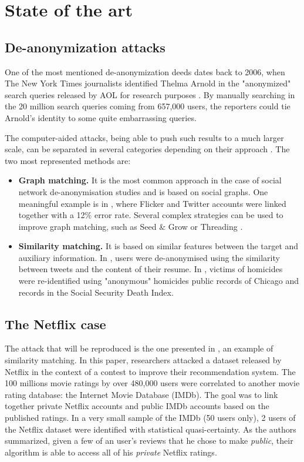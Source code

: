 \section{State of the art}\label{sec:state}

\subsection{De-anonymization attacks}

One of the most mentioned de-anonymization deeds dates back to 2006, when The New York Times journalists identified Thelma Arnold in the "anonymized" search queries released by AOL for research purposes \cite{nytimes}. By manually searching in the 20 million search queries coming from 657,000 users, the reporters could tie Arnold's identity to some quite embarrassing queries.

The computer-aided attacks, being able to push such results to a much larger scale, can be separated in several categories depending on their approach \cite{survey}. The two most represented methods are:

\begin{itemize}
	\item \textbf{Graph matching.} It is the most common approach in the case of social network de-anonymisation studies and is based on social graphs. One meaningful example is in \cite{graph_twitter}, where Flicker and Twitter accounts were linked together with a 12\% error rate. Several complex strategies can be used to improve graph matching, such as Seed \& Grow \cite{seed} or Threading \cite{threading}.
	
	\item \textbf{Similarity matching.} It is based on similar features between the target and auxiliary information. In \cite{tweets}, users were de-anonymised using the similarity between tweets and the content of their resume. In \cite{homicide}, victims of homicides were re-identified using "anonymous" homicides public records of Chicago and records in the Social Security Death Index.
\end{itemize}

\subsection{The Netflix case}

The attack that will be reproduced is the one presented in \cite{netflix}, an example of similarity matching. In this paper, researchers attacked a dataset released by Netflix in the context of a contest to improve their recommendation system. The 100 millions movie ratings by over 480,000 users were correlated to another movie rating database: the Internet Movie Database (IMDb). The goal was to link together private Netflix accounts and public IMDb accounts based on the published ratings. In a very small sample of the IMDb (50 users only), 2 users of the Netflix dataset were identified with statistical quasi-certainty. As the authors summarized, given a few of an user's reviews that he chose to make \textit{public}, their algorithm is able to access all of his \textit{private} Netflix ratings. 

